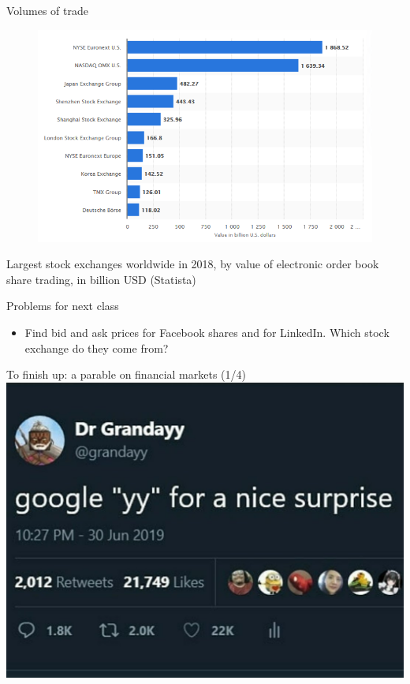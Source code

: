 \documentclass[english,10pt]{beamer}
\theoremstyle{definition}
\begin{document}
\begin{frame}{Volumes of trade}
\begin{figure}
	\includegraphics[width=.75\paperwidth]{pics/volumes2018}
\end{figure}
Largest stock exchanges worldwide in 2018, by value of electronic order book share trading, in billion USD (Statista)
\end{frame}


\begin{frame}{Problems for next class}
\begin{itemize}
	\item Find bid and ask prices for Facebook shares and for LinkedIn. Which stock exchange do they come from? 
\end{itemize}
\end{frame}


\begin{frame}{To finish up: a parable on financial markets (1/4)}
	\centering \includegraphics[width=0.6\paperwidth]{pics/yy1}
\end{frame}
\end{document}
